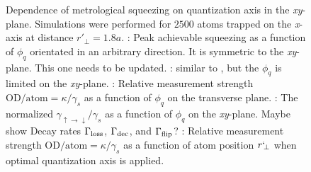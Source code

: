 \documentclass[preprint,aps,pra,onecolumn]{revtex4-1} %
\newcommand{\gammaud}{\gamma_{\uparrow \rightarrow \downarrow}}
\newcommand{\comment}[1]{{\color{Maroon} #1}}
\begin{document}
\begin{figure}
\begin{minipage}{.32\linewidth}
\end{minipage}
\caption{Dependence of metrological squeezing on quantization axis in the \emph{xy}-plane. Simulations were performed for $2500$ atoms trapped on the \emph{x}-axis at distance $ r'\!_\perp=1.8a$. 
\protect{}: Peak achievable squeezing as a function of $ \phi_q $ orientated in an arbitrary direction. 
It is symmetric to the \emph{xy}-plane. 
\comment{This one needs to be updated.}
\protect{}: similar to \protect{}, but the $ \phi_q $ is limited on the \emph{xy}-plane. 
\protect{}: Relative measurement strength $ \mathrm{OD}/\mathrm{atom}=\kappa/\gamma_s $ as a function of $ \phi_q $ on the transverse plane.
\protect{}: The normalized $ \gammaud/\gamma_s $ as a function of $ \phi_q $ on the \emph{xy}-plane. 
\comment{Maybe show Decay rates $\Gamma_{\rm loss}$, $\Gamma_{\rm dec}$, and $\Gamma_{\rm flip}$?} 
\protect{}: Relative measurement strength $ \mathrm{OD}/\mathrm{atom}=\kappa/\gamma_s $ as a function of atom position $ r`\!_\perp $ when optimal quantization axis is applied.}\label{Fig::Squeezing_QuantizationAxis}
\end{figure}
\end{document}
